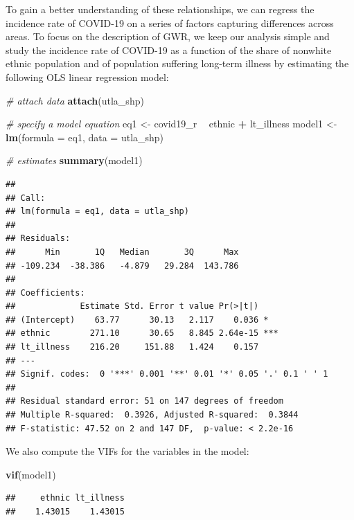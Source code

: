 \documentclass[]{book}
\newenvironment{Shaded}{\begin{snugshade}}{\end{snugshade}}
\newcommand{\KeywordTok}[1]{\textcolor[rgb]{0.13,0.29,0.53}{\textbf{#1}}}
\newcommand{\DataTypeTok}[1]{\textcolor[rgb]{0.13,0.29,0.53}{#1}}
\newcommand{\StringTok}[1]{\textcolor[rgb]{0.31,0.60,0.02}{#1}}
\newcommand{\CommentTok}[1]{\textcolor[rgb]{0.56,0.35,0.01}{\textit{#1}}}
\newcommand{\OperatorTok}[1]{\textcolor[rgb]{0.81,0.36,0.00}{\textbf{#1}}}
\newcommand{\NormalTok}[1]{#1}
\begin{document}
To gain a better understanding of these relationships, we can regress
the incidence rate of COVID-19 on a series of factors capturing
differences across areas. To focus on the description of GWR, we keep
our analysis simple and study the incidence rate of COVID-19 as a
function of the share of nonwhite ethnic population and of population
suffering long-term illness by estimating the following OLS linear
regression model:

\begin{Shaded}
\begin{Highlighting}[]
\CommentTok{# attach data}
\KeywordTok{attach}\NormalTok{(utla_shp)}

\CommentTok{# specify a model equation}
\NormalTok{eq1 <-}\StringTok{ }\NormalTok{covid19_r }\OperatorTok{~}\StringTok{ }\NormalTok{ethnic }\OperatorTok{+}\StringTok{ }\NormalTok{lt_illness}
\NormalTok{model1 <-}\StringTok{ }\KeywordTok{lm}\NormalTok{(}\DataTypeTok{formula =}\NormalTok{ eq1, }\DataTypeTok{data =}\NormalTok{ utla_shp)}

\CommentTok{# estimates}
\KeywordTok{summary}\NormalTok{(model1)}
\end{Highlighting}
\end{Shaded}

\begin{verbatim}
## 
## Call:
## lm(formula = eq1, data = utla_shp)
## 
## Residuals:
##      Min       1Q   Median       3Q      Max 
## -109.234  -38.386   -4.879   29.284  143.786 
## 
## Coefficients:
##             Estimate Std. Error t value Pr(>|t|)    
## (Intercept)    63.77      30.13   2.117    0.036 *  
## ethnic        271.10      30.65   8.845 2.64e-15 ***
## lt_illness    216.20     151.88   1.424    0.157    
## ---
## Signif. codes:  0 '***' 0.001 '**' 0.01 '*' 0.05 '.' 0.1 ' ' 1
## 
## Residual standard error: 51 on 147 degrees of freedom
## Multiple R-squared:  0.3926, Adjusted R-squared:  0.3844 
## F-statistic: 47.52 on 2 and 147 DF,  p-value: < 2.2e-16
\end{verbatim}

We also compute the VIFs for the variables in the model:

\begin{Shaded}
\begin{Highlighting}[]
\KeywordTok{vif}\NormalTok{(model1)}
\end{Highlighting}
\end{Shaded}

\begin{verbatim}
##     ethnic lt_illness 
##    1.43015    1.43015
\end{verbatim}
\end{document}
